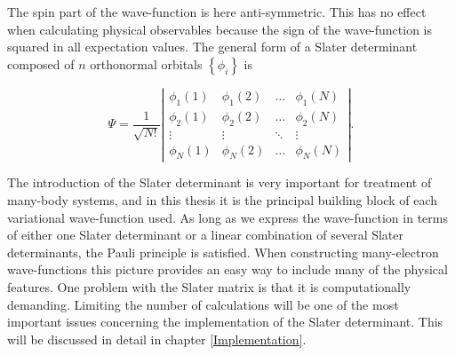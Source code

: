 The spin part of the wave-function is here anti-symmetric. This has no
effect when calculating physical observables because the sign of the
wave-function is squared in all expectation values.
\newline
%
\newline
The general form of a Slater determinant composed of $n$
orthonormal orbitals $\left\{ \phi_i \right\}$ is

\begin{equation}
  \Psi = \frac{1}{\sqrt{N!}}\left| 
  \begin{array}{cccc}
    \phi_1(1) & \phi_1(2) & \dots  &\phi_1(N) \\ [4pt]
    \phi_2(1) & \phi_2(2) & \dots  &\phi_2(N) \\ [4pt] 
    \vdots    & \vdots    & \ddots &\vdots    \\ [4pt]
    \phi_N(1) & \phi_N(2) & \dots  &\phi_N(N)
  \end{array}
  \right|.
\label{SlaterDeterminantDefinition}
\end{equation}

The introduction of the Slater determinant is very important for
treatment of many-body systems, and in this thesis it is the 
principal building block of each variational wave-function used.
As long as we express the wave-function in terms of either one Slater
determinant or a linear combination of several Slater determinants,
the Pauli principle is satisfied. When constructing
many-electron wave-functions this picture provides an easy way to
include many of the physical features. One problem with the Slater
matrix is that it is computationally demanding. Limiting the number of
calculations will be one of the most important issues concerning the
implementation of the Slater determinant. This will be discussed in
detail in chapter \ref{Implementation}.

